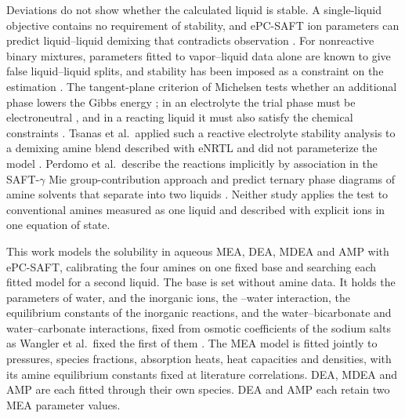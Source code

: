 Deviations do not show whether the calculated liquid is stable.
A single-liquid objective contains no requirement of stability, and ePC-SAFT ion parameters can predict liquid--liquid demixing that contradicts observation \cite{Held2014}.
For nonreactive binary mixtures, parameters fitted to vapor--liquid data alone are known to give false liquid--liquid splits, and stability has been imposed as a constraint on the estimation \cite{mitsosBilevelOptimizationFormulation2009,bollasBilevelOptimizationFormulation2009,glassParameterEstimationCubic2018,gauReliableNonlinearParameter2000}.
The tangent-plane criterion of Michelsen tests whether an additional phase lowers the Gibbs energy \cite{Michelsen1982}; in an electrolyte the trial phase must be electroneutral \cite{Perdomo2025}, and in a reacting liquid it must also satisfy the chemical constraints \cite{Tsanas2022,Ascani2022}.
Tsanas et al.\ applied such a reactive electrolyte stability analysis to a demixing amine blend described with eNRTL and did not parameterize the model \cite{Tsanas2022}.
Perdomo et al.\ describe the reactions implicitly by association in the SAFT-$\gamma$ Mie group-contribution approach and predict ternary phase diagrams of amine solvents that separate into two liquids \cite{perdomoPredictiveGroupcontributionFramework2023}.
Neither study applies the test to conventional amines measured as one liquid and described with explicit ions in one equation of state.

This work models the \COtwo solubility in aqueous MEA, DEA, MDEA and AMP with ePC-SAFT, calibrating the four amines on one fixed base and searching each fitted model for a second liquid.
The base is set without amine data.
It holds the parameters of water, \COtwo and the inorganic ions, the \COtwo--water interaction, the equilibrium constants of the inorganic reactions, and the water--bicarbonate and water--carbonate interactions, fixed from osmotic coefficients of the sodium salts as Wangler et al.\ fixed the first of them \cite{Wangler2018}.
The MEA model is fitted jointly to pressures, species fractions, absorption heats, heat capacities and densities, with its amine equilibrium constants fixed at literature correlations.
DEA, MDEA and AMP are each fitted through their own species.
DEA and AMP each retain two MEA parameter values.
